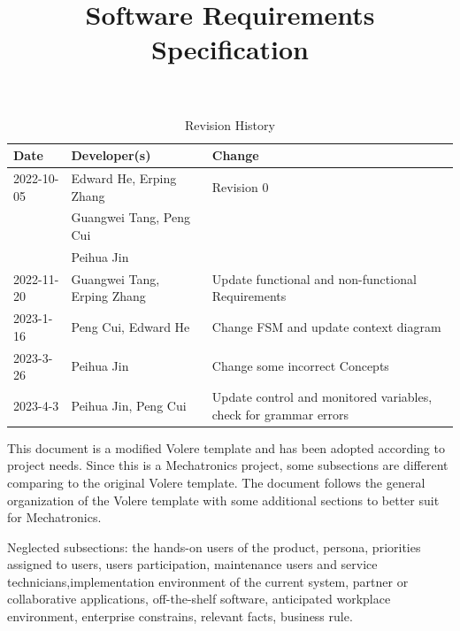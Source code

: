 \documentclass[12pt]{article}
\title{Software Requirements Specification\\\progname}
\author{\authname}
\date{}
\begin{document}
\maketitle

\newpage
\begin{table}[hp]
\caption{Revision History} \label{TblRevisionHistory}
\begin{tabularx}{\textwidth}{llX}
\toprule
\textbf{Date} & \textbf{Developer(s)} & \textbf{Change}\\
\midrule
2022-10-05 & Edward He, Erping Zhang & Revision 0\\
& Guangwei Tang, Peng Cui & \\
& Peihua Jin & \\
2022-11-20 & Guangwei Tang, Erping Zhang & Update functional and non-functional Requirements\\
2023-1-16 & Peng Cui, Edward He & Change FSM and update context diagram\\
2023-3-26 & Peihua Jin & Change some incorrect Concepts\\
2023-4-3 & Peihua Jin, Peng Cui & Update control and monitored variables, check for grammar errors\\
\bottomrule
\end{tabularx}
\end{table}


This document is a modified Volere template and has been adopted according to project needs. Since this is a Mechatronics project, some subsections are different comparing to the original Volere template. The document follows the general organization of the Volere template with some additional sections to better suit for Mechatronics. 

Neglected subsections: the hands-on users of the product, persona, priorities assigned to users, users participation, maintenance users and service technicians,implementation environment of the current system, partner or collaborative applications, off-the-shelf software, anticipated workplace environment, enterprise constrains, relevant facts, business rule.
\newpage


\tableofcontents

\newpage



\listoftables
\listoffigures

\newpage




\begin{table}

\end{table}
\end{document}
